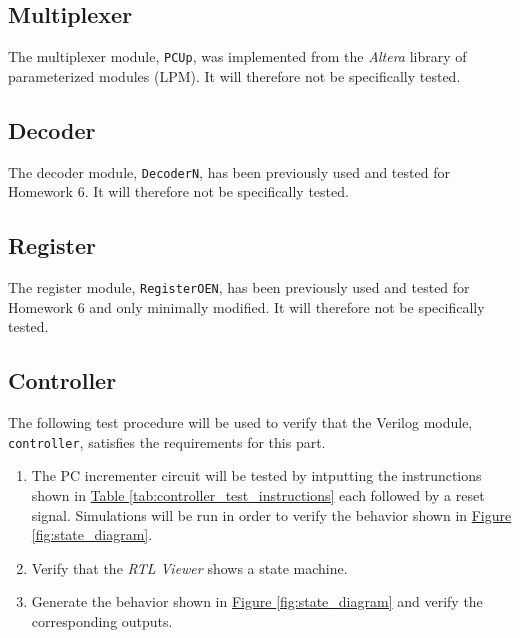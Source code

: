 \subsection{Multiplexer} %
\label{sub:multiplexer}

The multiplexer module, \verb|PCUp|, was implemented from the \emph{Altera} library of parameterized modules (LPM).
It will therefore not be specifically tested.


\subsection{Decoder} %
\label{sub:decoder}

The decoder module, \verb|DecoderN|, has been previously used and tested for Homework 6.
It will therefore not be specifically tested.

\subsection{Register} %
\label{sub:register}

The register module, \verb|RegisterOEN|, has been previously used and tested for Homework 6 and only minimally modified.
It will therefore not be specifically tested.

\FloatBarrier \subsection{Controller} %
\label{sub:controller_pro}

The following test procedure will be used to verify that the Verilog module, \verb|controller|, satisfies the requirements for this part.

\begin{enumerate}
    \item The PC incrementer circuit will be tested by intputting the instrunctions shown in \hyperref[tab:controller_test_instructions]{Table \ref*{tab:controller_test_instructions}}
    each followed by a reset signal.
    Simulations will be run in order to verify the behavior shown in
    \hyperref[fig:state_diagram]{Figure \ref*{fig:state_diagram}}.
    \item Verify that the \emph{RTL Viewer} shows a state machine.
    \item Generate the behavior shown in \hyperref[fig:state_diagram]{Figure \ref*{fig:state_diagram}} and verify the corresponding outputs.
\end{enumerate}

